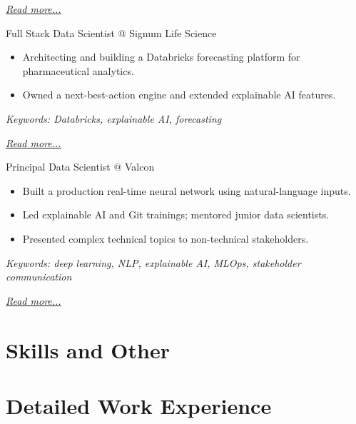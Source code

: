 \documentclass[11pt,a4paper]{moderncv}
\begin{document}
\hfill{\small{\textit{\hyperref[sec:raysearch]{Read more...}}}}

\large{Full Stack Data Scientist @ Signum Life Science}
\normalsize
\begin{itemize}
    \item Architecting and building a Databricks forecasting platform for pharmaceutical analytics.
    \item Owned a next-best-action engine and extended explainable AI features.
\end{itemize}

{\footnotesize\textit{Keywords: Databricks, explainable AI, forecasting}}

\hfill{\small{\textit{\hyperref[sec:signum]{Read more...}}}}

\large{Principal Data Scientist @ Valcon}
\normalsize
\begin{itemize}
    \item Built a production real-time neural network using natural-language inputs.
    \item Led explainable AI and Git trainings; mentored junior data scientists.
    \item Presented complex technical topics to non-technical stakeholders.
\end{itemize}

{\footnotesize\textit{Keywords: deep learning, NLP, explainable AI, MLOps, stakeholder communication}}

\hfill{\small{\textit{\hyperref[sec:valcon]{Read more...}}}}

\section{Skills and Other}
\normalsize
{}

\newpage

\section{Detailed Work Experience}
\end{document}
